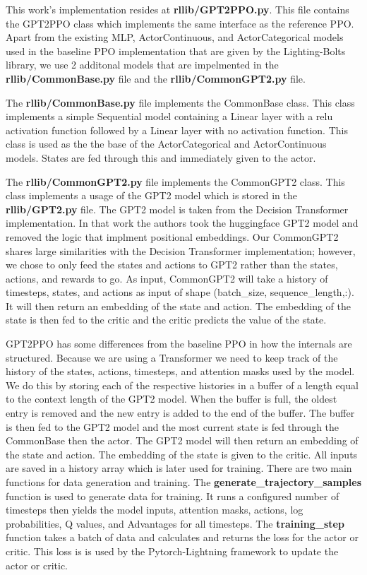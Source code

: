 This work's implementation resides at \textbf{rllib/GPT2PPO.py}. This file contains the GPT2PPO class which implements the same interface as
the reference PPO. Apart from the existing MLP, ActorContinuous, and ActorCategorical models used in the baseline PPO implementation that are
given by the Lighting-Bolts library, we use 2 additonal models that are impelmented in the \textbf{rllib/CommonBase.py} file and
the \textbf{rllib/CommonGPT2.py} file.

The \textbf{rllib/CommonBase.py} file implements the CommonBase class. This class implements a simple Sequential model containing a
Linear layer with a relu activation function followed by a Linear layer with no activation function. This class is used as the
the base of the ActorCategorical and ActorContinuous models. States are fed through this and immediately given to the actor.

The \textbf{rllib/CommonGPT2.py} file implements the CommonGPT2 class. This class implements a usage of the GPT2 model which is stored
in the \textbf{rllib/GPT2.py} file. The GPT2 model is taken from the Decision Transformer implementation\cite{chen2021decision}. In that work
the authors took the huggingface GPT2 model and removed the logic that implment positional embeddings\cite{radford2019language,wolf-etal-2020-transformers}.
Our CommonGPT2 shares large similarities with the Decision Transformer implementation\cite{chen2021decision}; however, we chose to only
feed the states and actions to GPT2 rather than the states, actions, and rewards to go. As input, CommonGPT2 will take a history of timesteps, states,
and actions as input of shape (batch\_size, sequence\_length,:). It will then return an embedding of the state and action. The embedding of the
state is then fed to the critic and the critic predicts the value of the state.

GPT2PPO has some differences from the baseline PPO in how the internals are structured. Because we are using a Transformer we need to keep track of the
history of the states, actions, timesteps, and attention masks used by the model. We do this by storing each of the respective histories in a buffer
of a length equal to the context length of the GPT2 model. When the buffer is full, the oldest entry is removed and the new entry is added to the end
of the buffer. The buffer is then fed to the GPT2 model and the most current state is fed through the CommonBase then the actor. The GPT2 model will
then return an embedding of the state and action. The embedding of the state is given to the critic. All inputs are saved in a history array which is
later used for training.
There are two main functions for data generation and training. The \textbf{generate\_trajectory\_samples} function is used to generate data for training.
It runs a configured number of timesteps then yields the model inputs, attention masks, actions, log probabilities, Q values, and Advantages for
all timesteps. The \textbf{training\_step} function takes a batch of data and calculates and returns the loss for the actor or critic. This loss is
is used by the Pytorch-Lightning framework to update the actor or critic.

